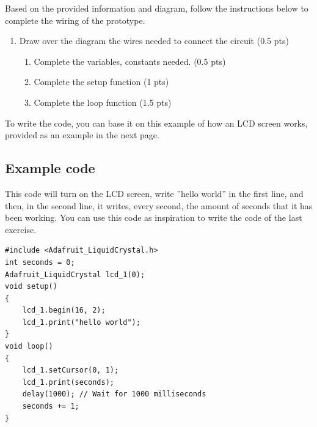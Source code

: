 \documentclass[10pt]{article}
\begin{document}
Based on the provided information and diagram, follow the instructions below to complete the
wiring of the prototype.
\begin{enumerate}
    \item Draw over the diagram the wires needed to connect the circuit (0.5 pts)
    \begin{enumerate}
        \item Complete the variables, constants needed. (0.5 pts)

\vspace{1.2cm}
        \item Complete the setup function (1 pts)
\vspace{1.2cm}
        \item Complete the loop function (1.5 pts)

\vspace{1.2cm}
    \end{enumerate}
\end{enumerate}

To write the code, you can base it on this example of how an LCD screen works, provided as an
example in the next page.

\clearpage\subsection*{Example code}
This code will turn on the LCD screen, write ”hello world” in the first line, and then, in the
second line, it writes, every second, the amount of seconds that it has been working. You can
use this code as inspiration to write the code of the last exercise.

\begin{verbatim}
#include <Adafruit_LiquidCrystal.h>
int seconds = 0;
Adafruit_LiquidCrystal lcd_1(0);
void setup()
{
    lcd_1.begin(16, 2);
    lcd_1.print("hello world");
}
void loop()
{
    lcd_1.setCursor(0, 1);
    lcd_1.print(seconds);
    delay(1000); // Wait for 1000 milliseconds
    seconds += 1;
}    
\end{verbatim}
\end{document}
